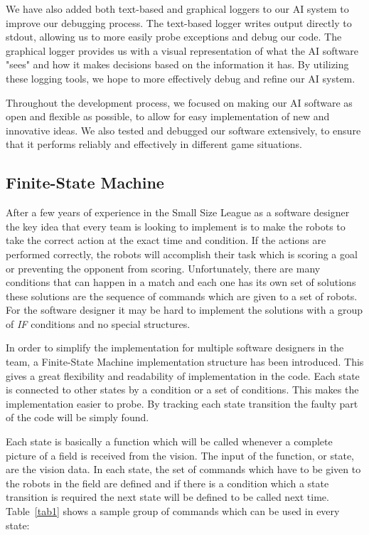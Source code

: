 \documentclass[runningheads]{llncs}
\begin{document}
We have also added both text-based and graphical loggers to our AI system to improve our debugging process. The text-based logger writes output directly to stdout, allowing us to more easily probe exceptions and debug our code. The graphical logger provides us with a visual representation of what the AI software "sees" and how it makes decisions based on the information it has. By utilizing these logging tools, we hope to more effectively debug and refine our AI system.

Throughout the development process, we focused on making our AI software as open and flexible as possible, to allow for easy implementation of new and innovative ideas. We also tested and debugged our software extensively, to ensure that it performs reliably and effectively in different game situations.

\subsection{Finite-State Machine} 
After a few years of experience in the Small Size League as a software designer the key idea that every team is looking to implement is to make the robots to take the correct action at the exact time and condition. If the actions are performed correctly, the robots will accomplish their task which is scoring a goal or preventing the opponent from scoring. Unfortunately, there are many conditions that can happen in a match and each one has its own set of solutions these solutions are the sequence of commands which are given to a set of robots. For the software designer it may be hard to implement the solutions with a group of \textit{IF} conditions and no special structures.

In order to simplify the implementation for multiple software designers in the team, a Finite-State Machine implementation structure has been introduced. This gives a great flexibility and readability of implementation in the code. Each state is connected to other states by a condition or a set of conditions. This makes the implementation easier to probe. By tracking each state transition the faulty part of the code will be simply found.

Each state is basically a function which will be called whenever a complete picture of a field is received from the vision. The input of the function, or state, are the vision data.  
In each state, the set of commands which have to be given to the robots in the field are defined and if there is a condition which a state transition is required the next state will be defined to be called next time.
Table~\ref{tab1} shows a sample group of commands which can be used in every state:
\end{document}
